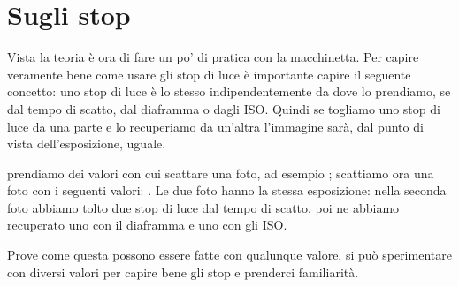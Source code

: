 \section{Sugli stop} \label{sec:sugli_stop}

Vista la teoria è ora di fare un po' di pratica con la macchinetta. Per capire veramente bene come usare gli stop di luce è importante capire il seguente concetto: uno stop di luce è lo stesso indipendentemente da dove lo prendiamo, se dal tempo di scatto, dal diaframma o dagli ISO. Quindi se togliamo uno stop di luce da una parte e lo recuperiamo da un'altra l'immagine sarà, dal punto di vista dell'esposizione, uguale.

\esperimento prendiamo dei valori con cui scattare una foto, ad esempio ; scattiamo ora una foto con i seguenti valori: .\newline
Le due foto hanno la stessa esposizione: nella seconda foto abbiamo tolto due stop di luce dal tempo di scatto, poi ne abbiamo recuperato uno con il diaframma e uno con gli ISO.

Prove come questa possono essere fatte con qualunque valore, si può sperimentare con diversi valori per capire bene gli stop e prenderci familiarità.
